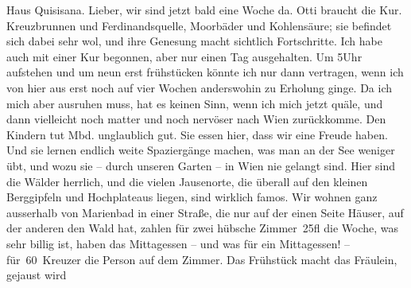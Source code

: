 \pstart
           \raggedleft{}Haus Quisisana.\pend
           \vspace{0.5em}
\pstart
           Lieber, wir sind jetzt bald eine Woche da. Otti braucht die Kur. Kreuzbrunnen und Ferdinandsquelle,
               Moorbäder und Kohlensäure; sie befindet sich dabei sehr wol, und ihre Genesung macht
               sichtlich Fortschritte. Ich habe auch mit einer Kur begonnen, aber nur einen Tag
               ausgehalten. Um 5Uhr aufstehen und um neun erst frühstücken
               könnte ich nur dann vertragen, wenn ich von hier aus erst noch auf vier Wochen
               anderswohin zu Erholung ginge. Da ich mich aber ausruhen muss, hat es keinen Sinn,
               wenn ich mich jetzt quäle, und dann vielleicht noch matter und noch nervöser nach Wien zurückkomme. Den Kindern tut Mbd. unglaublich gut. Sie essen hier, dass wir eine Freude
               haben. Und sie lernen endlich weite Spaziergänge machen, was man an der See weniger
               übt, und wozu sie – durch unseren Garten – in Wien
               nie gelangt sind. Hier sind die Wälder herrlich, und die vielen Jausenorte, die
               überall auf den kleinen Berggipfeln und Hochplateaus liegen, sind wirklich famos. Wir
               wohnen ganz ausserhalb von Marienbad in einer
               Straße, die nur auf der einen Seite Häuser, auf der anderen den Wald hat, zahlen für
               zwei hübsche Zimmer 25fl die Woche, was sehr billig ist, haben das Mittagessen – und
               was für ein Mittagessen! – für 60 Kreuzer die Person auf dem Zimmer. Das Frühstück
               macht das 
               Fräulein, gejaust wird
